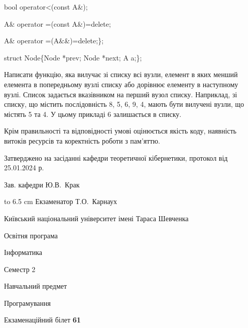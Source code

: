 \documentclass[12pt, ukrainian]{article}
\begin{document}
{\quad  bool operator<(const A\&); 

\quad A\& operator =(const A\&)=delete; 

\quad  A\& operator =(A\&\&)=delete;\};

struct Node\{Node *prev; Node *next; A a;\};

Написати функцію, яка вилучає зі списку всі вузли, елемент в яких менший елемента в попередньому вузлі списку або дорівнює елементу в наступному вузлі. Список задається вказівником на перший вузол списку. Наприклад, зі списку, що містить послідовність 8, 5, 6, 9, 4, мають бути вилучені вузли, що містять 5 та 4. У цьому прикладі 6 залишається в списку.

Крім правильності та відповідності умові оцінюється якість коду, наявність витоків ресурсів та коректність роботи з пам'яттю. 

}
{\smallskip\smallskip \begin {scriptsize} Затверджено на засіданні кафедри теоретичної кібернетики, протокол   від   25.01.2024 р.\par\smallskip\smallskip\smallskip\smallskip
{\parbox {6.5 cm} {Зав. кафедри \dotfill Ю.В.~Крак}}\hspace {0.7cm} {\hbox to 6.5 cm { Екзаменатор \dotfill Т.О.~Карнаух}} \end{scriptsize}}
\newpage
{{\begin {scriptsize}\par
{ \center  Київський національний університет імені Тараса Шевченка \par}
{\parbox {5 cm}{Освітня програма \hfill}{\parbox {7 cm}{Інформатика\hfill}}\parbox {6 cm}{\hfill Семестр 2}}\par
{\parbox {5 cm} {Навчальний предмет \hfill}\parbox {7 cm}{Програмування \hfill}\parbox {6cm}{\hfill}\par}\vspace{-15pt} \end{scriptsize}}{\center Екзаменаційний білет \No \textbf { 61 }\par}}
\end{document}
